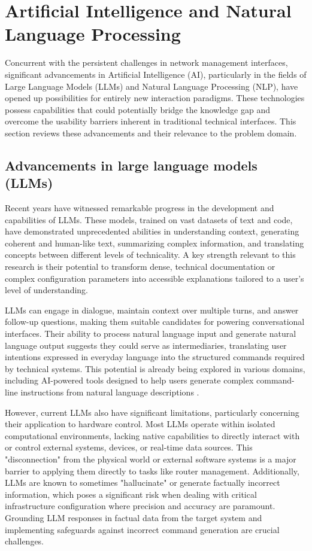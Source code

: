 \section{Artificial Intelligence and Natural Language Processing}
Concurrent with the persistent challenges in network management interfaces, significant advancements in Artificial Intelligence (AI), particularly in the fields of Large Language Models (LLMs) and Natural Language Processing (NLP), have opened up possibilities for entirely new interaction paradigms. These technologies possess capabilities that could potentially bridge the knowledge gap and overcome the usability barriers inherent in traditional technical interfaces. This section reviews these advancements and their relevance to the problem domain.

\subsection{Advancements in large language models (LLMs)}
Recent years have witnessed remarkable progress in the development and capabilities of LLMs. These models, trained on vast datasets of text and code, have demonstrated unprecedented abilities in understanding context, generating coherent and human-like text, summarizing complex information, and translating concepts between different levels of technicality. A key strength relevant to this research is their potential to transform dense, technical documentation or complex configuration parameters into accessible explanations tailored to a user's level of understanding.

LLMs can engage in dialogue, maintain context over multiple turns, and answer follow-up questions, making them suitable candidates for powering conversational interfaces. Their ability to process natural language input and generate natural language output suggests they could serve as intermediaries, translating user intentions expressed in everyday language into the structured commands required by technical systems. This potential is already being explored in various domains, including AI-powered tools designed to help users generate complex command-line instructions from natural language descriptions \cite{nlp_cybersecurity}.

However, current LLMs also have significant limitations, particularly concerning their application to hardware control. Most LLMs operate within isolated computational environments, lacking native capabilities to directly interact with or control external systems, devices, or real-time data sources. This "disconnection" from the physical world or external software systems is a major barrier to applying them directly to tasks like router management. Additionally, LLMs are known to sometimes "hallucinate" or generate factually incorrect information, which poses a significant risk when dealing with critical infrastructure configuration where precision and accuracy are paramount. Grounding LLM responses in factual data from the target system and implementing safeguards against incorrect command generation are crucial challenges.

